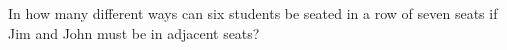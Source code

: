 In how many different ways can six students be seated in a row of seven seats if Jim and John must be in adjacent seats?
